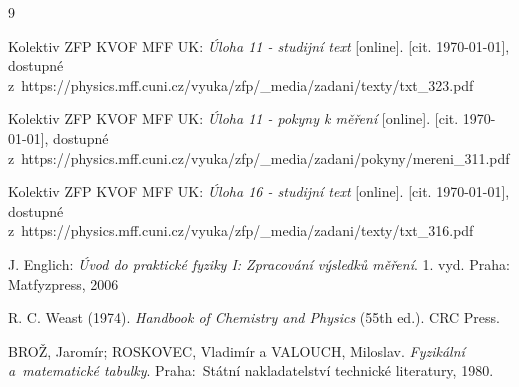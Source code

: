 \documentclass{../concepts/titul_protokol_p/prepareprotokol} %
\begin{document}
\begin{thebibliography}{9}

 Kolektiv ZFP KVOF MFF UK: \textit{Úloha 11 - studijní text} [online]. 
[cit. \today], dostupné z~https://physics.mff.cuni.cz/vyuka/zfp/\_media/zadani/texty/txt\_323.pdf

 Kolektiv ZFP KVOF MFF UK: \textit{Úloha 11 - pokyny k měření} [online]. [cit. \today], dostupné
z~https://physics.mff.cuni.cz/vyuka/zfp/\_media/zadani/pokyny/mereni\_311.pdf

 Kolektiv ZFP KVOF MFF UK: \textit{Úloha 16 - studijní text} 
[online]. [cit. \today], dostupné
z~https://physics.mff.cuni.cz/vyuka/zfp/\_media/zadani/texty/txt\_316.pdf

 J. Englich: \textit{Úvod do praktické fyziky I: Zpracování výsledků měření}. 
1. vyd. Praha: Matfyzpress, 2006

 R. C. Weast (1974). \textit{Handbook of Chemistry and Physics} (55th ed.). CRC Press.

 BROŽ, Jaromír; ROSKOVEC, Vladimír a VALOUCH, Miloslav. \textit{Fyzikální a~matematické tabulky}. 
Praha:~Státní nakladatelství technické literatury, 1980.


\end{thebibliography}
\end{document}
